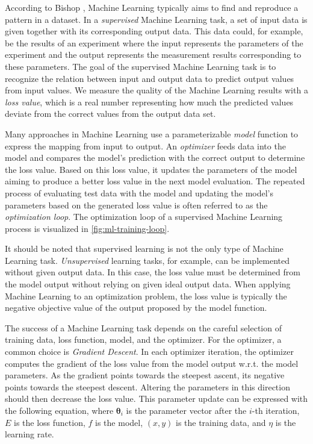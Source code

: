 According to Bishop \cite{bishop_pattern_2006}, Machine Learning typically aims
to find and reproduce a pattern in a dataset.
In a \emph{supervised} Machine Learning task, a set of input data is given
together with its corresponding output data.
This data could, for example, be the results of an experiment where the input
represents the parameters of the experiment and the output represents the
measurement results corresponding to these parameters.
The goal of the supervised Machine Learning task is to recognize the relation
between input and output data to predict output values from input values.
We measure the quality of the Machine Learning results with a
\emph{loss value}, which is a real number representing how much the predicted
values deviate from the correct values from the output data set.

Many approaches in Machine Learning use a parameterizable \emph{model} function
to express the mapping from input to output.
An \emph{optimizer} feeds data into the model and compares the model's
prediction with the correct output to determine the loss value.
Based on this loss value, it updates the parameters of the model aiming to
produce a better loss value in the next model evaluation. 
The repeated process of evaluating test data with the model and updating the
model's parameters based on the generated loss value is often referred to as the
\emph{optimization loop}.
The optimization loop of a supervised Machine Learning process is visualized in
\autoref{fig:ml-training-loop}.

It should be noted that supervised learning is not the only type of
Machine Learning task.
\emph{Unsupervised} learning tasks, for example, can be implemented without
given output data.
In this case, the loss value must be determined from the model output without
relying on given ideal output data.
When applying Machine Learning to an optimization problem, the loss value is
typically the negative objective value of the output proposed by the model
function.

The success of a Machine Learning task depends on the careful selection of
training data, loss function, model, and the optimizer.
For the optimizer, a common choice is \emph{Gradient Descent}.
In each optimizer iteration, the optimizer computes the gradient of the loss
value from the model output w.r.t. the model parameters.
As the gradient points towards the steepest ascent, its negative points towards
the steepest descent.
Altering the parameters in this direction should then decrease the loss value.
This parameter update can be expressed with the following equation, where
$\mathbf{\theta}_i$ is the parameter vector after the $i$-th iteration, $E$ is
the loss function, $f$ is the model, $(x,y)$ is the training data, and $\eta$ is
the learning rate.

